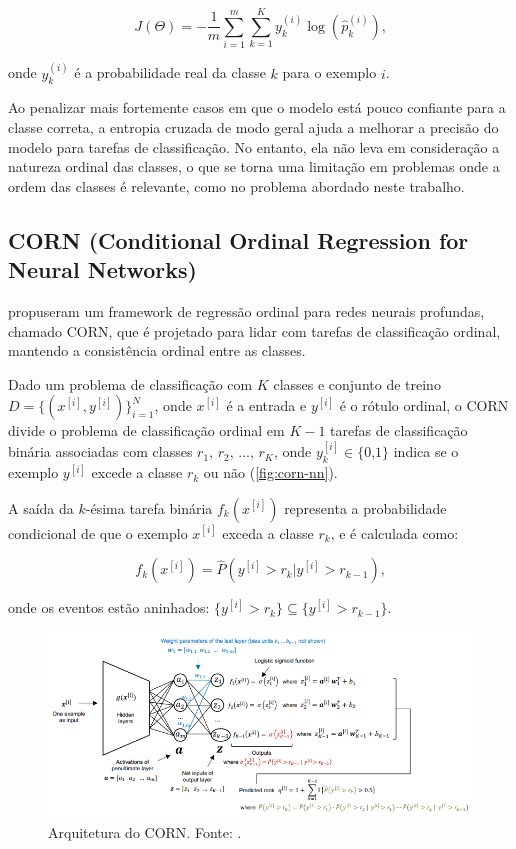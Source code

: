 \begin{equation}
    J(\Theta) = -\frac{1}{m} \sum_{i=1}^{m} \sum_{k=1}^{K} y_{k}^{(i)} \log(\hat{p}_k^{(i)}) \text{,}
\end{equation}

onde $y_{k}^{(i)}$ é a probabilidade real da classe $k$ para o exemplo $i$.

Ao penalizar mais fortemente casos em que o modelo está pouco confiante para a classe correta, a entropia cruzada de modo geral ajuda a melhorar a precisão do modelo para tarefas de classificação. No entanto, ela não leva em consideração a natureza ordinal das classes, o que se torna uma limitação em problemas onde a ordem das classes é relevante, como no problema abordado neste trabalho.

\subsection{CORN (Conditional Ordinal Regression for Neural Networks)}

\cite{Shi_2023} propuseram um framework de regressão ordinal para redes neurais profundas, chamado CORN, que é projetado para lidar com tarefas de classificação ordinal, mantendo a consistência ordinal entre as classes.

Dado um problema de classificação com $K$ classes e conjunto de treino $D = \{(x^{[i]}, y^{[i]})\}_{i=1}^{N}$, onde $x^{[i]}$ é a entrada e $y^{[i]}$ é o rótulo ordinal, o CORN divide o problema de classificação ordinal em $K-1$ tarefas de classificação binária associadas com classes $r_1$, $r_2$, $...$, $r_K$, onde $y_{k}^{[i]} \in \lbrace 0 \text{,} 1 \rbrace$ indica se o exemplo $y^{[i]}$ excede a classe $r_k$ ou não (\autoref{fig:corn-nn}).

A saída da $k$-ésima tarefa binária $f_k (x^{[i]})$ representa a probabilidade condicional de que o exemplo $x^{[i]}$ exceda a classe $r_k$, e é calculada como:

\begin{equation}
    f_k (x^{[i]}) = \hat{P} (y^{[i]} > r_k | y^{[i]} > r_{k-1}) \text{,}
\end{equation}

onde os eventos estão aninhados: $\lbrace y^{[i]} > r_k \rbrace \subseteq \lbrace y^{[i]} > r_{k-1} \rbrace$.

\begin{figure}
    \centering
    \includegraphics[width=\linewidth]{figs/corn-nn.png}
    \caption{Arquitetura do CORN. Fonte: \cite{Shi_2023}.}
    \label{fig:corn-nn}
\end{figure}

